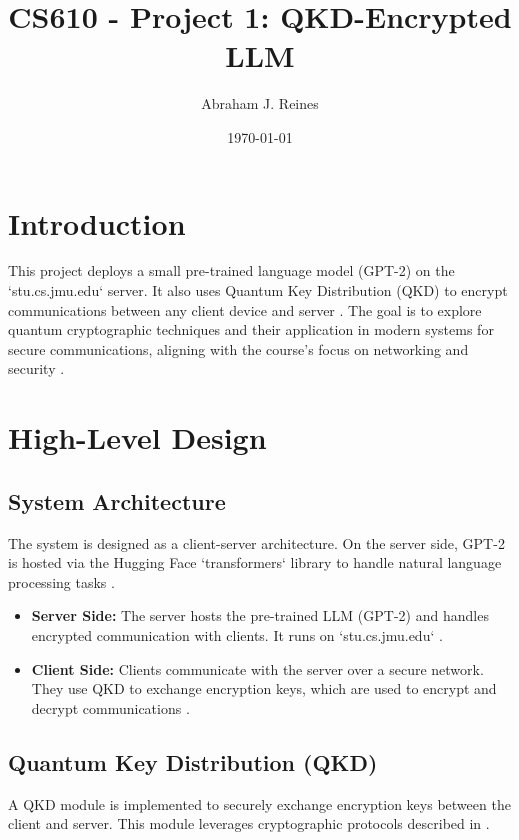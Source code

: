 \documentclass{article}
\title{CS610 - Project 1: QKD-Encrypted LLM}
\author{Abraham J. Reines}
\date{\today}
\begin{document}
\maketitle


\section{Introduction}
This project deploys a small pre-trained language model (GPT-2) on the `stu.cs.jmu.edu` server. It also uses Quantum Key Distribution (QKD) to encrypt communications between any client device and server \parencite{yin2017, patel2020}. The goal is to explore quantum cryptographic techniques and their application in modern systems for secure communications, aligning with the course's focus on networking and security \parencite{tanenbaum2020}.

\section{High-Level Design}

\subsection{System Architecture}
The system is designed as a client-server architecture. On the server side, GPT-2 is hosted via the Hugging Face `transformers` library to handle natural language processing tasks \parencite{huggingface_gpt2_2024, jalammar_gpt2_illustration_2024}. 
\begin{itemize}
    \item \textbf{Server Side:} The server hosts the pre-trained LLM (GPT-2) and handles encrypted communication with clients. It runs on `stu.cs.jmu.edu` \parencite{lo2012}.
    \item \textbf{Client Side:} Clients communicate with the server over a secure network. They use QKD to exchange encryption keys, which are used to encrypt and decrypt communications \parencite{scarani2014, patel2020}.
\end{itemize}

\subsection{Quantum Key Distribution (QKD)}
A QKD module is implemented to securely exchange encryption keys between the client and server. This module leverages cryptographic protocols described in \parencite{bennett1984, lo2012, scarani2014, nsa2024}.
\end{document}
